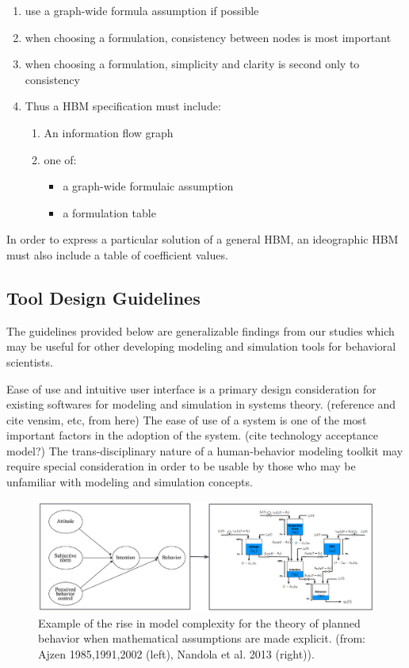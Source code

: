 \documentclass[conference]{IEEEtran}
\begin{document}
\begin{enumerate}
  \item use a graph-wide formula assumption if possible
  \item when choosing a formulation, consistency between nodes is most important
  \item when choosing a formulation, simplicity and clarity is second only to consistency
  \item Thus a HBM specification must include:
  \begin{enumerate}
   \item An information flow graph
   \item one of:
    \begin{itemize}
      \item a graph-wide formulaic assumption
      \item a formulation table 
    \end{itemize}
  \end{enumerate}
\end{enumerate}

In order to express a particular solution of a general HBM, an ideographic HBM must also include a table of coefficient values. 

\subsection{Tool Design Guidelines}

The guidelines provided below are generalizable findings from our studies which may be useful for other developing modeling and simulation tools for behavioral scientists.


Ease of use and intuitive user interface is a primary design consideration for existing softwares for modeling and simulation in systems theory. (reference and cite vensim, etc, from here) 
The ease of use of a system is one of the most important factors in the adoption of the system. (cite technology acceptance model?) 
The trans-disciplinary nature of a human-behavior modeling toolkit may require special consideration in order to be usable by those who may be unfamiliar with modeling and simulation concepts.

\begin{figure}[!t]
  \centering
  \includegraphics[width=0.9\columnwidth]{img/path2flow}  
  \caption{Example of the rise in model complexity for the theory of planned behavior when mathematical assumptions are made explicit. (from: Ajzen 1985,1991,2002 (left), Nandola et al. 2013 (right)).}
  \label{path2flow}
\end{figure}
\end{document}
